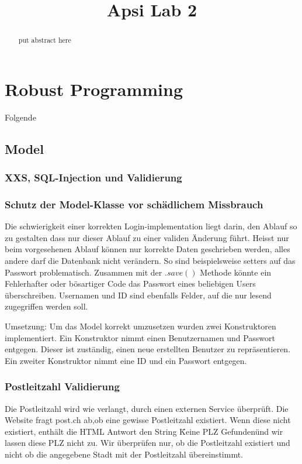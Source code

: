 \documentclass[10pt]{scrartcl}
\title{ %
Apsi
\vspace{0.2cm}
\Large Lab 2 }
\begin{document}
 \maketitle
 \thispagestyle{firststyle}
 \pagestyle{firststyle}
 \begin{abstract}
 \begin{center}
  put abstract here  
 \end{center}
 \vspace{0.5cm}
\hrulefill
\end{abstract}

 \pagestyle{documentstyle}
 \tableofcontents
 \pagebreak
\section{Robust Programming}
Folgende
\subsection{Model}
\subsubsection{XXS, SQL-Injection und Validierung}

\subsubsection{Schutz der Model-Klasse vor schädlichem Missbrauch}
Die schwierigkeit einer korrekten Login-implementation liegt darin, den Ablauf so zu gestalten dass nur dieser Ablauf zu einer validen Änderung führt. Heisst nur beim vorgesehenen Ablauf können nur korrekte Daten geschrieben werden, alles andere darf die Datenbank nicht verändern. So sind beispielsweise setters auf das Passwort problematisch. Zusammen mit der $.save()$ Methode könnte ein Fehlerhafter oder bösartiger Code das Passwort eines beliebigen Users überschreiben. Usernamen und ID sind ebenfalls Felder, auf die nur lesend zugegriffen werden soll.

Umsetzung:
Um das Model korrekt umzusetzen wurden zwei Konstruktoren implementiert. Ein Konstruktor nimmt einen Benutzernamen und Passwort entgegen. Dieser ist zuständig, einen neue erstellten Benutzer zu repräsentieren. Ein zweiter Konstruktor nimmt eine ID und ein Passwort entgegen. 

\subsubsection{Postleitzahl Validierung}
Die Postleitzahl wird wie verlangt, durch einen externen Service überprüft. Die Website fragt post.ch ab,ob eine gewisse Postleitzahl existiert. Wenn diese nicht existiert, enthält die HTML Antwort den String \"Keine PLZ Gefunden\" und wir lassen diese PLZ nicht zu. Wir überprüfen nur, ob die Postleitzahl existiert und nicht ob die angegebene Stadt mit der Postleitzahl übereinstimmt. 
\end{document}
